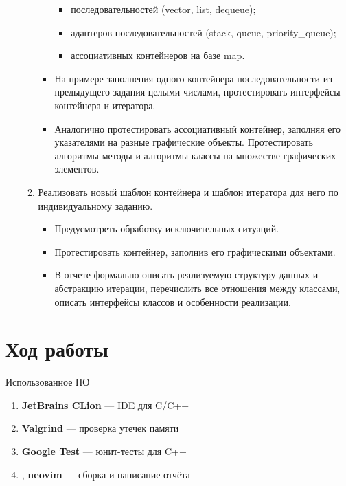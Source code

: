 \documentclass[a4paper, 14pt]{extarticle}
\begin{document}
\begin{enumerate}
\begin{enumerate}
\begin{itemize}
            \begin{itemize}
                \item последовательностей (vector, list, dequeue);
                \item адаптеров последовательностей (stack, queue, priority\_queue);
                \item ассоциативных контейнеров на базе map.
            \end{itemize}
            \item На примере заполнения одного контейнера-последовательности из предыдущего задания целыми числами, протестировать интерфейсы контейнера и итератора.
            \item Аналогично протестировать ассоциативный контейнер, заполняя его указателями на разные графические объекты. Протестировать алгоритмы-методы и алгоритмы-классы на множестве графических элементов.
        \end{itemize}
        \item Реализовать новый шаблон контейнера и шаблон итератора для него по индивидуальному заданию.
        \begin{itemize}
            \item Предусмотреть обработку исключительных ситуаций.
            \item Протестировать контейнер, заполнив его графическими объектами.
            \item В отчете формально описать реализуемую структуру данных и абстракцию итерации, перечислить все отношения между классами, описать интерфейсы классов и особенности реализации.
        \end{itemize}
    \end{enumerate}
\end{enumerate}

\section{Ход работы}
Использованное ПО
\begin{enumerate}
    \item \textbf{JetBrains CLion} --- IDE для C/C++
    \item \textbf{Valgrind} --- проверка утечек памяти
    \item \textbf{Google Test} --- юнит-тесты для C++ 
    \item \XeLaTeX{}, \textbf{neovim} --- сборка и написание отчёта 
\end{enumerate}
\end{document}

